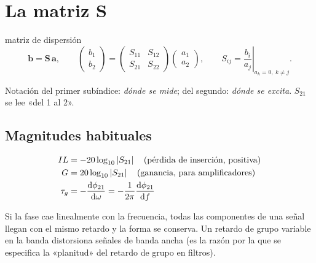 \section{La matriz S}
\begin{definicion}{matriz de dispersión}
\begin{equation}
  \mathbf{b} = \mathbf{S}\,\mathbf{a}, \qquad
  \begin{pmatrix} b_1 \\ b_2 \end{pmatrix} = \begin{pmatrix} S_{11} & S_{12} \\ S_{21} & S_{22} \end{pmatrix}\begin{pmatrix} a_1 \\ a_2 \end{pmatrix},
  \qquad S_{ij} = \left.\frac{b_i}{a_j}\right|_{a_k = 0,\ k\ne j}.
\end{equation}
\begin{donde}
\end{donde}
\end{definicion}
Notación del primer subíndice: \emph{dónde se mide}; del segundo: \emph{dónde se excita}. $S_{21}$ se lee «del 1 al 2».

\subsection{Magnitudes habituales}
\begin{align}
  IL &= -20\log_{10}\left|S_{21}\right| \quad\text{(pérdida de inserción, positiva)}\\
  G &= 20\log_{10}\left|S_{21}\right| \quad\text{(ganancia, para amplificadores)}\\
  \tau_g &= -\frac{\mathrm{d}\phi_{21}}{\mathrm{d}\omega} = -\frac{1}{2\pi}\frac{\mathrm{d}\phi_{21}}{\mathrm{d} f}
\end{align}
\begin{donde}
\end{donde}
\begin{intuicion}
Si la fase cae linealmente con la frecuencia, todas las componentes de una señal llegan con el mismo retardo y la forma se conserva.
Un retardo de grupo variable en la banda distorsiona señales de banda ancha (es la razón por la que se especifica la «planitud» del
retardo de grupo en filtros).
\end{intuicion}

